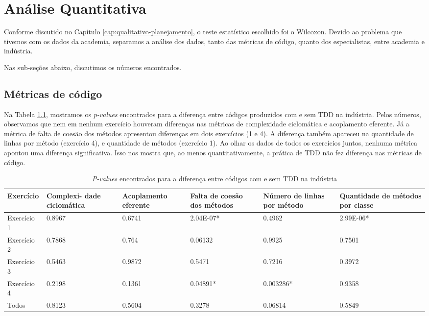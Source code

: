 \chapter{Análise Quantitativa}

Conforme discutido no Capítulo \ref{cap:qualitativo-planejamento}, o teste
estatístico escolhido foi o Wilcoxon. 
Devido ao problema que tivemos com os dados da academia, separamos a análise
dos dados, tanto das métricas de código, quanto dos especialistas, entre academia e indústria.

Nas sub-seções abaixo, discutimos os números encontrados.

\section{Métricas de código}

Na Tabela \ref{metricas-industria}, mostramos os \textit{p-values} encontrados para
a diferença entre códigos produzidos com e sem TDD na indústria. Pelos números, 
observamos que nem em nenhum exercício houveram diferenças nas métricas
de complexidade ciclomática e acoplamento eferente. Já a métrica de falta
de coesão dos métodos apresentou diferenças em dois exercícios (1 e 4). 
A diferença também apareceu na quantidade de linhas por método (exercício 4),
e quantidade de métodos (exercício 1). Ao olhar os dados de todos os exercícios
juntos, nenhuma métrica apontou uma diferença significativa.
Isso nos mostra que, ao menos quantitativamente, a prática de TDD não fez
diferença nas métricas de código.

\begin{table}[h!]
	\centering
	\begin{tabular}{ | p{3cm} | p{2cm} | p{2cm} | p{2cm} | p{2cm} | p{2cm} |}
		\hline
		Exercício & Complexi- dade ciclomática & Acoplamento eferente & Falta de coesão dos métodos & Número de linhas por método 
		& Quantidade de métodos por classe \\
		\hline
		Exercício 1 &	0.8967	&	0.6741 &	2.04E-07* &	0.4962 &	2.99E-06* \\
		Exercício 2	& 0.7868	&	0.764 &	0.06132 &	0.9925 &	0.7501 \\
		Exercício 3	& 0.5463	&	0.9872 &	0.5471 &	0.7216 &	0.3972\\
		Exercício 4	& 0.2198	&	0.1361 &	0.04891* &	0.003286* &	0.9358\\
		\hline
		Todos &	0.8123	&	0.5604 &	0.3278 &	0.06814 &	0.5849\\
		\hline
	\end{tabular}
	\caption{\textit{P-values} encontrados para a diferença entre códigos com e sem TDD na indústria}
	\label{metricas-industria}
\end{table}

